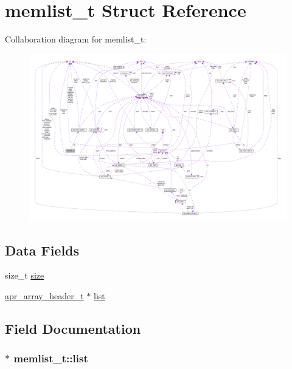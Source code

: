 \hypertarget{structmemlist__t}{}\section{memlist\+\_\+t Struct Reference}
\label{structmemlist__t}


Collaboration diagram for memlist\+\_\+t\+:
\nopagebreak
\begin{figure}[H]
\begin{center}
\leavevmode
\includegraphics[width=350pt]{structmemlist__t__coll__graph}
\end{center}
\end{figure}
\subsection*{Data Fields}
\begin{DoxyCompactItemize}
\item 
size\+\_\+t \hyperlink{structmemlist__t_a36fa7aec9c4d87cda753c4757bb05214}{size}
\item 
\hyperlink{structapr__array__header__t}{apr\+\_\+array\+\_\+header\+\_\+t} $\ast$ \hyperlink{structmemlist__t_a75f90b4dad4adcde367a07860e56a6fa}{list}
\end{DoxyCompactItemize}


\subsection{Field Documentation}
\subsubsection[{\texorpdfstring{list}{list}}]{$\ast$ memlist\+\_\+t\+::list}\hypertarget{structmemlist__t_a75f90b4dad4adcde367a07860e56a6fa}{}\label{structmemlist__t_a75f90b4dad4adcde367a07860e56a6fa}
